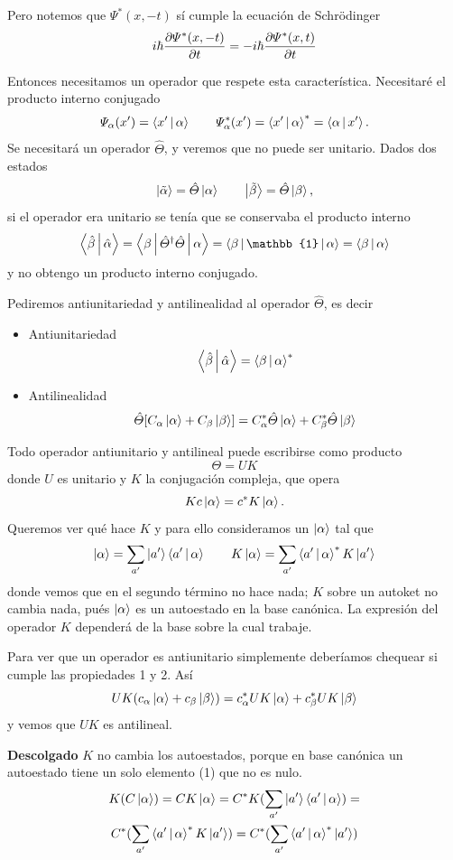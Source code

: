 \documentclass[10pt,oneside]{CBFT_book}
\begin{document}
Pero notemos que $\Psi^*(x,-t)$ sí cumple la ecuación de Schrödinger
\[
	i \hbar \frac{\partial^{\hspace{-0.05em}} {\Psi^*(x,-t)}}{\partial {t}^{\hspace{-0.05em}}} = -i \hbar \frac{\partial^{\hspace{-0.05em}} {\Psi^*(x,t)}}{\partial {t}^{\hspace{-0.05em}}} 
\]

Entonces necesitamos un operador que respete esta característica.
Necesitaré el producto interno conjugado 
\[
	\Psi_\alpha(x') = \Braket{x'|\alpha} \qquad
	\Psi^*_\alpha(x') = \Braket{x'|\alpha}^* = \Braket{\alpha|x'}.
\]
Se necesitará un operador $\hat{\Theta}$, y veremos que no puede ser unitario.
Dados dos estados
\[
	\Ket{\tilde{\alpha}} = \hat{\Theta}\Ket{\alpha} \qquad 
	\Ket{\tilde{\beta}} = \hat{\Theta}\Ket{\beta},
\]
si el operador era unitario se tenía que se conservaba el producto interno 
\[
	\Braket{\hat{\beta}|\hat{\alpha}} = 
	\Braket{\beta|\hat{\Theta}^\dagger\hat{\Theta}|\alpha} =
	\Braket{\beta|\mathbb{1}|\alpha} = \Braket{\beta|\alpha}
\]
y no obtengo un producto interno conjugado.

Pediremos antiunitariedad y antilinealidad al operador $\hat{\Theta}$, es decir
\begin{itemize}
 \item Antiunitariedad 
 \[
	\Braket{\hat{\beta}|\hat{\alpha}} = \Braket{{\beta}|{\alpha}}^*
\]
 \item Antilinealidad
\[
	\hat{\Theta}[ C_\alpha\Ket{\alpha} + C_\beta\Ket{\beta}] = 
	C_\alpha^*\hat{\Theta}\Ket{\alpha} + C_\beta^*\hat{\Theta}\Ket{\beta}
\]
\end{itemize}

Todo operador antiunitario y antilineal puede escribirse como producto 
\[
	\Theta = U K
\]
donde $U$ es unitario y $K$ la conjugación compleja, que opera
\[
	K c \Ket{\alpha} = c^* K \Ket{\alpha}.
\]
Queremos ver qué hace $K$ y para ello consideramos un $\Ket{\alpha}$ tal que
\[
	\Ket{\alpha} = \sum_{a'} \Ket{a'} \Braket{ a' | \alpha } \qquad 
	K \Ket{\alpha} = \sum_{a'}  \Braket{ a' | \alpha }^* K\Ket{a'}
\]
donde vemos que en el segundo término no hace nada; $K$ sobre un autoket no cambia nada, pués
$\Ket{\alpha}$ es un autoestado en la base canónica. La expresión del operador $K$ dependerá de la
base sobre la cual trabaje.

Para ver que un operador es antiunitario simplemente deberíamos chequear si cumple las propiedades
1 y 2. Así
\[
	UK ( c_\alpha \Ket{\alpha} + c_\beta \Ket{\beta} ) = 
	c_\alpha^* U K \Ket{\alpha} + c_\beta^* U K \Ket{\beta}
\]
y vemos que $UK$ es antilineal.


\begin{ejemplo}{\bf Descolgado}
$K$ no cambia los autoestados, porque en base canónica 
un autoestado tiene un solo elemento (1) que no es nulo.
\begin{multline*}
	K(C\Ket{\alpha}) = CK\Ket{\alpha} = C^*K(\sum_{a'} \Ket{a'}\Braket{a'|\alpha}) = \\
	C^* (\sum_{a'} \Braket{a'|\alpha}^* K \Ket{a'}) =
	C^* (\sum_{a'} \Braket{a'|\alpha}^* \Ket{a'})  
\end{multline*}

\end{ejemplo}
\end{document}

